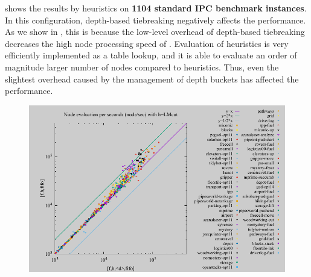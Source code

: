  shows the results by \mands heuristics on \textbf{1104 standard
IPC benchmark instances}.
In this configuration, depth-based tiebreaking negatively affects the performance.
As we show in , this is because
the low-level overhead of depth-based tiebreaking decreases the high
node processing speed of \mands. Evaluation of \mands heuristics is
very efficiently implemented as a table lookup, and it is able to
evaluate an order of magnitude larger number of nodes
compared to \lmcut heuristics. Thus, even the slightest overhead caused
by the management of depth buckets has affected the performance.

\begin{figure}[htbp]
 \centering
 \includegraphics{img/node-sec/lmhiF-lmh_F.pdf}

\end{figure}
